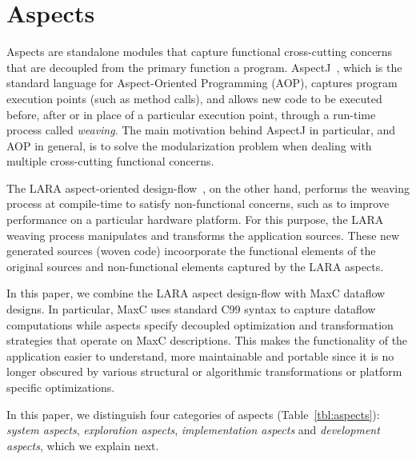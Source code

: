 \section{Aspects}

Aspects are standalone modules that capture functional cross-cutting concerns 
that are decoupled from the primary function a program. AspectJ~\cite{Kiczales:2001}, which is the standard language for Aspect-Oriented Programming (AOP),  captures program execution points (such as method calls), and allows new code to be executed before, after or in place of a particular execution point, through a run-time process called \emph{weaving}. The main motivation behind AspectJ in particular, and AOP in general, is to solve the modularization problem when dealing with multiple cross-cutting functional concerns. 

The LARA aspect-oriented design-flow~\cite{Cardoso:Carvalho:Coutinho:Luk:Nobre:Diniz:Petrov:2012}, on the other hand, performs the weaving process at compile-time to satisfy non-functional concerns, such as to improve performance on a particular hardware platform. For this purpose, the LARA weaving process manipulates and transforms the application sources. These new generated sources (woven code) incoorporate the functional elements of the original sources and non-functional elements captured by the LARA aspects.

In this paper, we combine the LARA aspect design-flow with MaxC dataflow designs. In particular, MaxC uses standard C99 syntax to capture dataflow computations while aspects specify decoupled optimization and transformation strategies that operate on MaxC descriptions. This makes the
functionality of the application easier to understand, more
maintainable and portable since it is no longer obscured by various
structural or algorithmic transformations or platform specific
optimizations.

In this paper, we distinguish four categories of aspects (Table~\ref{tbl:aspects}): \emph{system aspects}, \emph{exploration aspects}, \emph{implementation aspects} and
\emph{development aspects}, which we explain next.

\newcommand{\blt}{\raise .2ex\hbox{\tiny$\bullet$ }}

